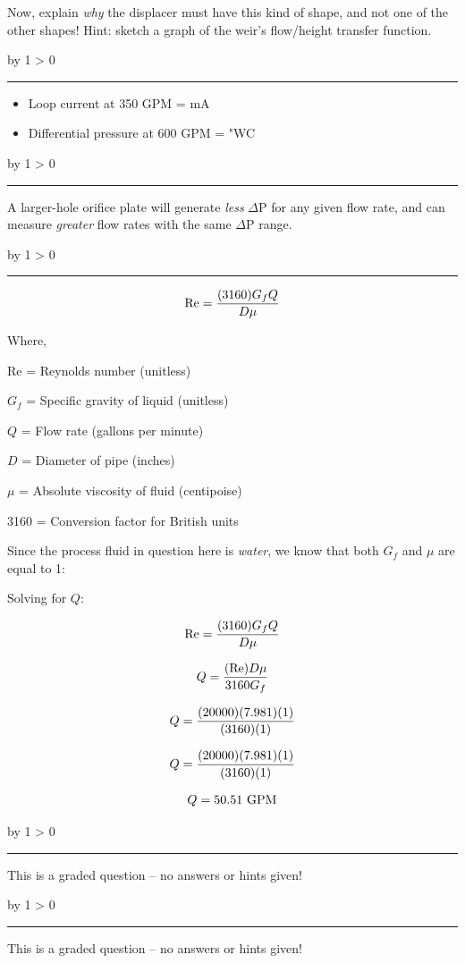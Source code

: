 \documentclass[12pt,a4paper]{article}
\def\svar{
           \advance\answnum by 1
           \ifnum \answnum > 0
                \hrule
                \vskip 3pt
                \leftline{Svar \the\answnum}
                \vskip 3pt \fi}
\begin{document}
Now, explain {\it why} the displacer must have this kind of shape, and not one of the other shapes!  Hint: sketch a graph of the weir's flow/height transfer function.

\vskip 10pt \filbreak 
\svar{} 

\begin{itemize}
\item{} Loop current at 350 GPM =  mA
\vskip 5pt
\item{} Differential pressure at 600 GPM =  "WC
\end{itemize}

\vskip 10pt \filbreak 
\svar{} 

A larger-hole orifice plate will generate {\it less} $\Delta$P for any given flow rate, and can measure {\it greater} flow rates with the same $\Delta$P range.

\vskip 10pt \filbreak 
\svar{} 

$$\hbox{Re} = {{(3160) G_f Q} \over {D \mu}}$$

\noindent
Where,

Re = Reynolds number (unitless)

$G_f$ = Specific gravity of liquid (unitless)

$Q$ = Flow rate (gallons per minute)

$D$ = Diameter of pipe (inches)

$\mu$ = Absolute viscosity of fluid (centipoise)

3160 = Conversion factor for British units

\vskip 10pt

Since the process fluid in question here is {\it water}, we know that both $G_f$ and $\mu$ are equal to 1:

\vskip 10pt

Solving for $Q$:

$$\hbox{Re} = {{(3160) G_f Q} \over {D \mu}}$$

$$Q = {(\hbox{Re}) D \mu \over 3160 G_f}$$

$$Q = {(20000) (7.981) (1) \over (3160) (1)}$$

$$Q = {(20000) (7.981) (1) \over (3160) (1)}$$

$$Q = 50.51 \hbox{ GPM}$$

\vskip 10pt \filbreak 
\svar{} 

This is a graded question -- no answers or hints given!

\vskip 10pt \filbreak 
\svar{} 

This is a graded question -- no answers or hints given!
\end{document}
